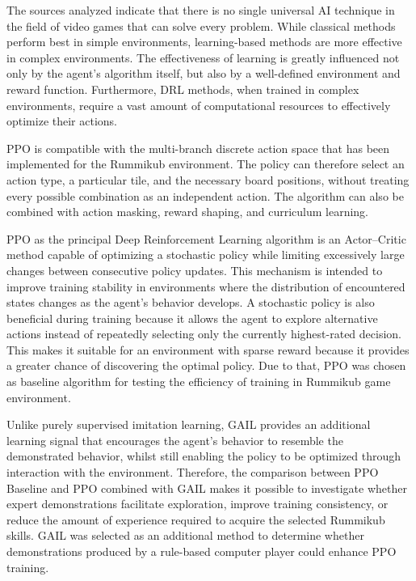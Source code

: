 The sources analyzed indicate that there is no single universal AI technique in the field of video games that can solve every problem. While classical methods perform best in simple environments, learning-based methods are more effective in complex environments. The effectiveness of learning is greatly influenced not only by the agent’s algorithm itself, but also by a well-defined environment and reward function. Furthermore, DRL methods, when trained in complex environments, require a vast amount of computational resources to effectively optimize their actions.

PPO is compatible with the multi-branch discrete action space that has been implemented for the Rummikub environment. The policy can therefore select an action type, a particular tile, and the necessary board positions, without treating every possible combination as an independent action. The algorithm can also be combined with action masking, reward shaping, and curriculum learning.

PPO as the principal Deep Reinforcement Learning algorithm is an Actor--Critic method capable of optimizing a stochastic policy while limiting excessively large changes between consecutive policy updates. This mechanism is intended to improve training stability in environments where the distribution of encountered states changes as the agent's behavior develops. A stochastic policy is also beneficial during training because it allows the agent to explore alternative actions instead of repeatedly selecting only the currently highest-rated decision. This makes it suitable for an environment with sparse reward because it provides a greater chance of discovering the optimal policy. Due to that, PPO was chosen as baseline algorithm for testing the efficiency of training in Rummikub game environment. 



Unlike purely supervised imitation learning, GAIL provides an additional learning signal that encourages the agent's behavior to resemble the demonstrated behavior, whilst still enabling the policy to be optimized through interaction with the environment. Therefore, the comparison between PPO Baseline and PPO combined with GAIL makes it possible to investigate whether expert demonstrations facilitate exploration, improve training consistency, or reduce the amount of experience required to acquire the selected Rummikub skills. GAIL was selected as an additional method to determine whether demonstrations produced by a rule-based computer player could enhance PPO training.

